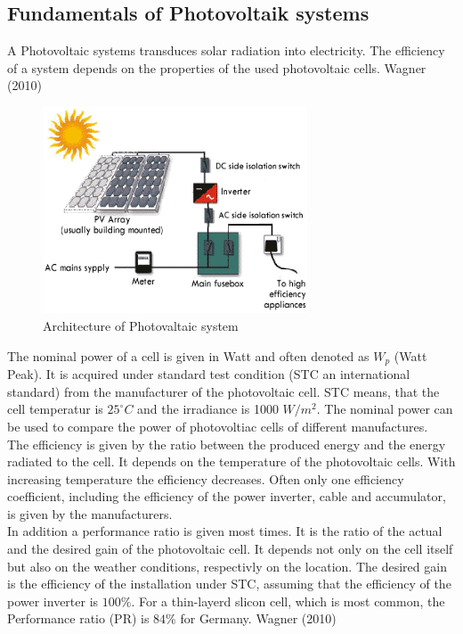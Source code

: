 \subsection{Fundamentals of Photovoltaik systems}

A Photovoltaic systems transduces solar radiation into electricity. The efficiency of a system depends on the properties of the used photovoltaic cells. Wagner (2010)  \\

\begin{figure}[hbt!]
\centering
\includegraphics[width=0.7\textwidth]{phase2/group2/figure/pv-system-configuration.png}
\caption{Architecture of Photovaltaic system}
\label{fig:PV_system}
\end{figure}

The nominal power of a cell is given in Watt and often denoted as \(W_p\) (Watt Peak). It is acquired under standard test condition (STC an international standard) from the manufacturer of the photovoltaic cell. STC means, that the cell temperatur is \(25^\circ C\) and the irradiance is 1000 \(W/m^2\). The nominal power can be used to compare the power of photovoltiac cells of different manufactures. 
\\
The efficiency is given by the ratio between the produced energy and the energy radiated to the cell. It depends on the temperature of the photovoltaic cells. With increasing temperature the efficiency decreases. Often only one efficiency coefficient, including the efficiency of the power inverter, cable and accumulator, is given by the manufacturers.
\\
In addition a performance ratio is given most times. It is the ratio of the actual and the desired gain of the photovoltaic cell. It depends not only on the cell itself but also on the weather conditions, respectivly on the location. The desired gain is the efficiency of the installation under STC, assuming that the efficiency of the power inverter is \(100\%\). For a thin-layerd slicon cell, which is most common, the Performance ratio (PR) is \(84\% \) for Germany.
Wagner (2010)

